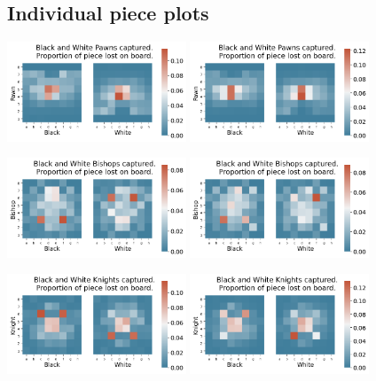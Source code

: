 \documentclass[11pt]{article}
\begin{document}
\subsection{Individual piece plots}
\label{sec:org2fc28e3}
\begin{center}
\includegraphics[width=0.4\textwidth]{Images/_HEATMAP_Pawn_FISC.png}
\includegraphics[width=0.4\textwidth]{Images/_HEATMAP_Pawn_TOURNEMENTS.png}
\end{center}
\begin{center}
\includegraphics[width=0.4\textwidth]{Images/_HEATMAP_Bishop_FISC.png}
\includegraphics[width=0.4\textwidth]{Images/_HEATMAP_Bishop_TOURNEMENTS.png}
\end{center}
\begin{center}
\includegraphics[width=0.4\textwidth]{Images/_HEATMAP_Knight_FISC.png}
\includegraphics[width=0.4\textwidth]{Images/_HEATMAP_Knight_TOURNEMENTS.png}
\end{center}
\end{document}
